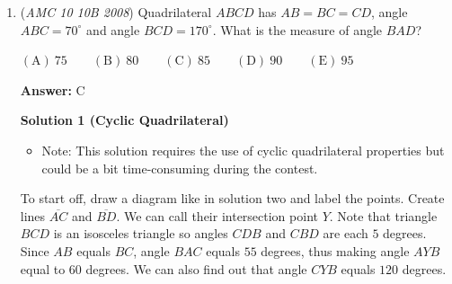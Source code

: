 \begin{enumerate}
 \textbf{Answer: }B



\textbf{Solution}

Because the unpainted part of the floor covers half the area, then the painted rectangle covers half the area as well. Since the border width is 1 foot, the dimensions of the rectangle are $a-2$ by $b-2$. With this information we can make the equation:

 
 \begin{eqnarray*} ab &=& 2\left((a-2)(b-2)\right) \\ ab &=& 2ab - 4a - 4b + 8 \\ ab - 4a - 4b + 8 &=& 0  \end{eqnarray*}Applying \href{https://artofproblemsolving.com/wiki/index.php?title=Simon\%27s\_Favorite\_Factoring\_Trick}{Simon's Favorite Factoring Trick}, we get

 
 \begin{eqnarray*}ab - 4a - 4b + 16 &=& 8 \\ (a-4)(b-4) &=& 8 \end{eqnarray*}

 Since $b > a$, then we have the possibilities $(a-4) = 1$ and $(b-4) = 8$, or $(a-4) = 2$ and $(b-4) = 4$. This allows for 2 possibilities: $(5,12)$ or $(6,8)$ which gives us $\boxed{\textbf{(B)} \: 2}$



	\item (\textit{AMC 10 10B 2008}) Quadrilateral $ABCD$ has $AB = BC = CD$, angle $ABC = 70^\circ$ and angle $BCD = 170^\circ$. What is the measure of angle $BAD$?


 $\mathrm{(A)}\ 75\qquad\mathrm{(B)}\ 80\qquad\mathrm{(C)}\ 85\qquad\mathrm{(D)}\ 90\qquad\mathrm{(E)}\ 95$

 \textbf{Answer: }C



\textbf{Solution 1 (Cyclic Quadrilateral)}


            \begin{itemize}
        \item Note: This solution requires the use of cyclic quadrilateral properties but could be a bit time-consuming during the contest.
            \end{itemize}
            To start off, draw a diagram like in solution two and label the points. Create lines $\overline{AC}$ and $\overline{BD}$. We can call their intersection point $Y$. Note that triangle $BCD$ is an isosceles triangle so angles $CDB$ and $CBD$ are each $5$ degrees. Since $AB$ equals $BC$, angle $BAC$ equals $55$ degrees, thus making angle $AYB$ equal to $60$ degrees. We can also find out that angle $CYB$ equals $120$ degrees. 


\end{enumerate}
